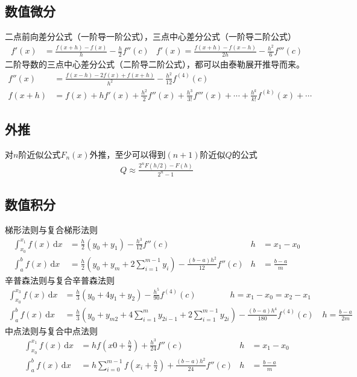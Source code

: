 \documentclass[twocolumn]{article}
\begin{document}
\subsection{数值微分}
二点前向差分公式（一阶导一阶公式），三点中心差分公式（一阶导二阶公式）
\begin{align*}
    f'(x) & =\frac{f(x+h)-f(x)}{h}-\frac{h}{2}f''(c) & f'(x)=\frac{f(x+h)-f(x-h)}{2h}-\frac{h^2}{6}f'''(c)
\end{align*}
二阶导数的三点中心差分公式（二阶导二阶公式），都可以由泰勒展开推导而来。
\begin{align*}
    f''(x) & =\frac{f(x-h)-2f(x)+f(x+h)}{h^2}-\frac{h^2}{12}f^{(4)}(c)                                     \\
    f(x+h) & =f(x)+hf'(x)+\frac{h^2}{2}f''(x)+\frac{h^3}{3!}f'''(x)+\cdots+\frac{h^k}{k!}f^{(k)}(x)+\cdots
\end{align*}

\subsection{外推}
对$n$阶近似公式$F_n(x)$外推，至少可以得到$(n+1)$阶近似$Q$的公式
\begin{align*}
    Q \approx \frac{2^nF(h/2)-F(h)}{2^n-1}
\end{align*}

\subsection{数值积分}
梯形法则与复合梯形法则
\begin{align*}
    \int_{x_0}^{x_1} f(x) \,\mathrm{d}x & = \frac{h}{2}(y_0+y_1)-\frac{h^3}{12}f''(c)                           & h & =x_1-x_0       \\
    \int_{a}^{b} f(x) \,\mathrm{d}x     & = \frac{h}{2}(y_0+y_m+2\sum_{i=1}^{m-1}y_i)-\frac{(b-a)h^2}{12}f''(c) & h & =\frac{b-a}{m}
\end{align*}
辛普森法则与复合辛普森法则
\begin{align*}
    \int_{x_0}^{x_3} f(x) \,\mathrm{d}x & = \frac{h}{3}(y_0+4y_1+y_2)-\frac{h^5}{90}f^{(4)}(c) \qquad \qquad h=x_1-x_0=x_2-x_1                                            \\
    \int_{a}^{b} f(x) \,\mathrm{d}x     & = \frac{h}{3}(y_0+y_{m2}+4\sum_{i=1}^{m}y_{2i-1}+2\sum_{i=1}^{m-1}y_{2i})-\frac{(b-a)h^4}{180}f^{(4)}(c) \quad h=\frac{b-a}{2m}
\end{align*}
中点法则与复合中点法则
\begin{align*}
    \int_{x_0}^{x_1} f(x) \,\mathrm{d}x & =hf(x0+\frac{h}{2})+\frac{h^3}{24}f''(c)                       & h & =x_1-x_0       \\
    \int_{a}^{b} f(x) \,\mathrm{d}x     & =h\sum_{i=0}^{m-1}f(x_i+\frac{h}{2})+\frac{(b-a)h^2}{24}f''(c) & h & =\frac{b-a}{m}
\end{align*}
\end{document}
